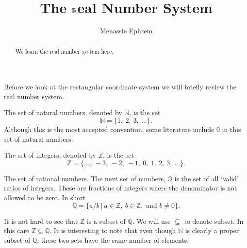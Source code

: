 \documentclass{ximera}
\title{The $\mathbb{R}$eal Number System}
\author{Menassie Ephrem}
\newcommand{\IN}{\mathbb{N}}
\newcommand{\IQ}{\mathbb{Q}}
\newcommand{\IZ}{\mathbb{Z}}
\begin{document}
\begin{abstract}
We learn the real number system here.
\end{abstract}

\maketitle
Before we look at the rectangular coordinate system we will briefly review the real number system.

{The set of natural numbers,} denoted by $\IN$, is the set $$\IN = \{1,~2,~3, ~\ldots\}.$$
Although this is the most accepted convention, some literature include $0$ in this set of natural numbers.

{The set of integers,} denoted by $\IZ$, is the set $$\IZ = \{\ldots, ~-3, ~-2, ~-1, ~0, ~1,~2, ~3, ~\ldots\}.$$  

{The set of rational numbers.} The next set of numbers, $\IQ$ is the set of all `valid' ratios of integers.  These are fractions of integers where the denominator is not allowed to be zero.  In short $$\IQ = \{ a/b~ |~ a \in \IZ,~ b \in \IZ, \text{ and } b \neq 0\}.$$

It is not hard to see that $\IZ$ is a subset of $\IQ$. We will use $\subseteq$ to denote subset.  In this care $\IZ \subseteq \IQ$. It is interesting to note that even though $\IN$ is clearly a proper subset of $\IQ$, these two sets have the same number of elements.
\end{document}
